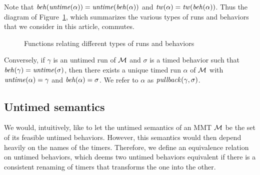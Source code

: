 Note that $\mathit{beh}(\mathit{untime}(\alpha))=\mathit{untime}(\mathit{beh}(\alpha))$ and $\mathit{tw}(\alpha) = \mathit{tw}(\mathit{beh}(\alpha))$.
Thus the diagram of Figure~\ref{fig:diagram}, which summarizes the various types of runs and behaviors that we consider
in this article, commutes.
\begin{figure}[h]
\centering
{}
\caption{Functions relating different types of runs and behaviors}
\label{fig:diagram}
\end{figure}
Conversely, if $\gamma$ is an untimed run  of ${\cal M}$ and $\sigma$ is a timed behavior such that $\mathit{beh}(\gamma) = \mathit{untime}(\sigma)$,
then there exists a unique timed run $\alpha$ of ${\cal M}$ with $\mathit{untime}(\alpha) = \gamma$ and $\mathit{beh}(\alpha) = \sigma$.
We refer to $\alpha$ as $\mathit{pullback}(\gamma,\sigma)$.

\subsection{Untimed semantics}
We would, intuitively, like to let the untimed semantics of an MMT ${\cal M}$ be the set of its feasible untimed behaviors.
However, this semantics would then depend heavily on the names of the timers. Therefore, we define an equivalence relation
on untimed behaviors, which deems two untimed behaviors equivalent if there is a consistent renaming of timers that transforms
the one into the other.

